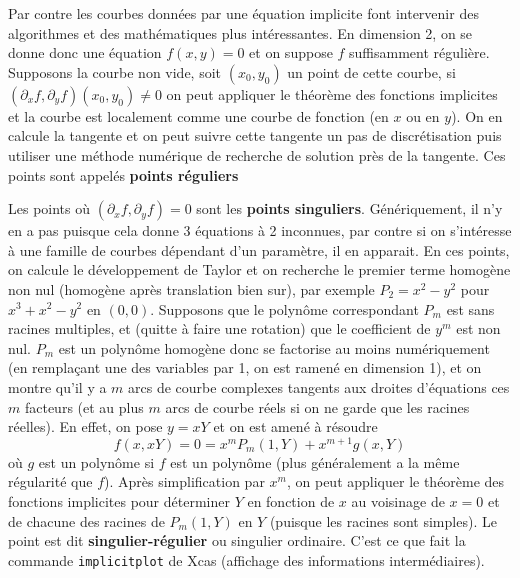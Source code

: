 \documentclass[a4paper,11pt]{book}
\begin{document}
\begin{giacjshere}
Par contre les courbes donn\'ees par une \'equation implicite
font intervenir des algorithmes et des math\'ematiques
plus int\'eressantes. En dimension 2, on se donne donc
une \'equation $f(x,y)=0$ et on suppose $f$ suffisamment
r\'eguli\`ere. Supposons la courbe non vide, soit $(x_0,y_0)$
un point de cette courbe, si $(\partial_x f,\partial_y f)(x_0,y_0) \neq
0$ on peut appliquer le th\'eor\`eme des fonctions implicites
et la courbe est localement comme une courbe de fonction (en $x$ ou
en $y$). On en calcule la tangente et on peut suivre cette tangente
un pas de discr\'etisation puis utiliser une m\'ethode num\'erique
de recherche de solution pr\`es de la tangente. Ces points
sont appel\'es {\bf points r\'eguliers}

Les points o\`u $(\partial_x f,\partial_y f)=0$ sont
les {\bf points singuliers}. 
G\'en\'eriquement, il n'y en a pas puisque
cela donne 3 \'equations \`a 2 inconnues, par contre si on
s'int\'eresse \`a une famille de courbes d\'ependant d'un
param\`etre, il en apparait. En ces points, on calcule le
d\'eveloppement de Taylor et on recherche le premier
terme homog\`ene non nul (homog\`ene apr\`es translation bien sur), 
par exemple
$P_2=x^2-y^2$ pour $x^3+x^2-y^2$ en $(0,0)$. 
Supposons que le polyn\^ome
correspondant $P_m$ est sans racines multiples, et (quitte
\`a faire une rotation) que le coefficient de $y^m$ est non nul.
$P_m$ est un polyn\^ome homog\`ene 
donc se factorise au moins num\'eriquement
(en rempla\c{c}ant une des variables par 1, on est ramen\'e en dimension 1),
et on montre qu'il y a $m$ arcs de courbe complexes tangents
aux droites d'\'equations ces $m$ facteurs (et au plus
$m$ arcs de courbe r\'eels si on ne garde
que les racines r\'eelles). En effet, on pose $y=xY$ et on 
est amen\'e \`a r\'esoudre
$$ f(x,xY)=0=x^mP_m(1,Y) + x^{m+1} g(x,Y)$$
o\`u $g$ est un polyn\^ome si $f$ est un polyn\^ome 
(plus g\'en\'eralement a la m\^eme r\'egularit\'e que $f$). 
Apr\`es simplification par $x^m$, on peut appliquer le th\'eor\`eme des
fonctions implicites pour d\'eterminer $Y$ en fonction de $x$ au
voisinage de $x=0$ et de chacune des racines de $P_m(1,Y)$ en $Y$
(puisque les racines sont simples).
Le point 
est dit {\bf singulier-r\'egulier} ou
singulier ordinaire. 
C'est ce que fait la commande \verb|implicitplot| de Xcas
(affichage des informations interm\'ediaires).


\end{giacjshere}
\end{document}
